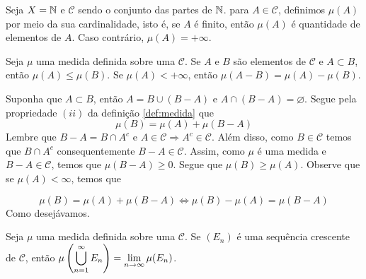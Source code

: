\begin{example}
    Seja $X = \operatorname{\mathbb{N}}$ e $\mathcal{C}$ sendo o conjunto das partes de $\operatorname{\mathbb{N}}$. 
para $A \in \mathcal{C}$, definimos $\mu(A)$ por meio da sua cardinalidade, isto é, se $A$ é finito, então $\mu(A)$ é quantidade de elementos de $A$. Caso contrário, $\mu(A) = +\infty$.

\end{example}





\begin{theorem}
\label{teo:operacoes-com-medidas-1}
	Seja $\mu$ uma medida definida sobre uma \sigal $\mathcal{C}$.
	Se $A$ e $B$ são elementos de $\mathcal{C}$ e $A \subset B$, então $\mu(A) \leq \mu(B)$.
	Se $\mu(A) < +\infty$, então $\mu(A-B) = \mu(A) - \mu(B)$.
\end{theorem}

\begin{prova}
	Suponha que $A \subset B$, então $A = B \cup (B - A)$ e $A \cap (B - A) = \varnothing$. Segue pela propriedade $(ii)$ da definição \ref{def:medida} que 
	$$\mu(B) = \mu(A) + \mu(B-A)$$
	Lembre que $B-A = B\cap A^c$ e $A \in \mathcal{C} \Rightarrow A^c \in \mathcal{C}$.
	Além disso, como $B \in \mathcal{C}$ temos que $ B\cap A^c$ consequentemente $B - A \in \mathcal{C}$.
	Assim, como $\mu$ é uma medida e $B-A \in \mathcal{C}$, temos que $\mu(B-A) \geq 0$.
	Segue que $\mu(B) \geq \mu(A)$.
	Observe que se $\mu(A) < \infty$, temos que 

	$$\mu(B) = \mu(A) + \mu(B-A) 
 \Leftrightarrow \mu(B) - \mu(A) =  \mu(B-A)
 $$
Como desejávamos.
\end{prova}

\begin{proposition}
\label{prop:limite-sequencia-crescente}
Seja $\mu$ uma medida definida sobre uma \sigal $\mathcal{C}$.
Se $(E_n)$ é uma sequência crescente de $\mathcal{C}$, então $\mu\left(\displaystyle \bigcup_{n = 1}^\infty E_n\right) = \displaystyle \lim_{n \to \infty} \mu(E_n)$.
\end{proposition} 

